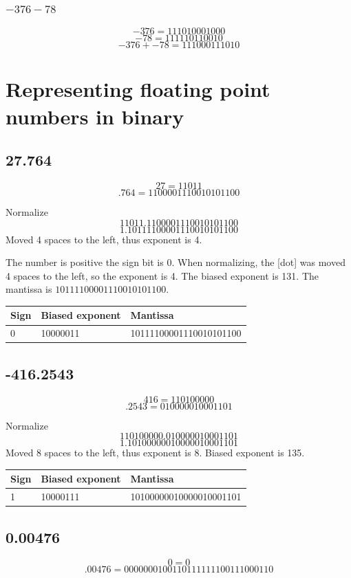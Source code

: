 \documentclass[12pt]{article}
\begin{document}
\subsubsection{$-376-78$}
\[-376=111010001000\]
\[-78=111110110010\]
\[-376+-78=111000111010\]

\section{Representing floating point numbers in binary}

\subsection{27.764}
\[27 = 11011\]
\[.764 = 1100001110010101100\]

Normalize
\[11011.1100001110010101100\]
\[1.10111100001110010101100\]
Moved 4 spaces to the left, thus exponent is 4.

The number is positive the sign bit is 0. When normalizing, the [dot] was moved 4 spaces to the left, so the exponent is 4. The biased exponent is 131. The mantissa is $10111100001110010101100$.

\begin{tabular}{l|l|l}
  Sign& Biased exponent & Mantissa \\
  \hline
  0& 10000011& 10111100001110010101100\\
\end{tabular}

\subsection{-416.2543}
\[416 = 110100000\]
\[.2543 = 010000010001101\]

Normalize
\[110100000.010000010001101\]
\[1.10100000010000010001101\]
Moved 8 spaces to the left, thus exponent is 8. Biased exponent is 135.


\begin{tabular}{l|l|l}
  Sign& Biased exponent & Mantissa \\
  \hline
  1 & 10000111 & 10100000010000010001101\\
\end{tabular}

\subsection{0.00476}
\[0 = 0\]
\[.00476 = 0000000100110111111100111000110\]
\end{document}

